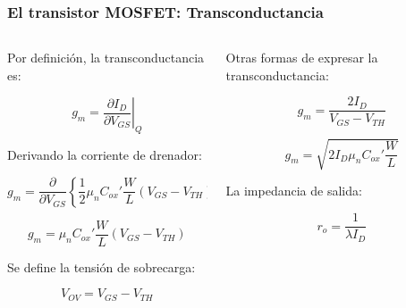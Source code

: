\begin{frame}[t]
    \frametitle{El transistor MOSFET: Transconductancia}

    \begin{columns}
        \begin{column}{0.5\textwidth}
            Por definición, la transconductancia es:

            \[ g_m = \left. \dfrac{\partial I_D}{\partial V_{GS}} \right|_Q \]
        
            Derivando la corriente de drenador:
        
            \[ g_m = \dfrac{\partial}{\partial V_{GS}} \left\{ \dfrac{1}{2} \mu_n C_{ox}' \dfrac{W}{L} (V_{GS}-V_{TH})^2 \right\} \]
        
            \[ \boxed{g_m = \mu_n C_{ox}' \dfrac{W}{L} (V_{GS}-V_{TH})} \]
            
            \vspace{3mm}
            Se define la tensión de sobrecarga:

            \[ V_{OV} = V_{GS} - V_{TH} \]

        \end{column}
        \begin{column}{0.5\textwidth}
            Otras formas de expresar la transconductancia:

            \[ g_m = \dfrac{2I_D}{V_{GS}-V_{TH}} \]

            \[ g_m = \sqrt{2 I_D \mu_n C_{ox}' \dfrac{W}{L} } \]

            \vspace{3mm}
            La impedancia de salida:

            \[ r_o = \dfrac{1}{\lambda I_D} \]

            \vfill
        \end{column}
    \end{columns}
\end{frame}

